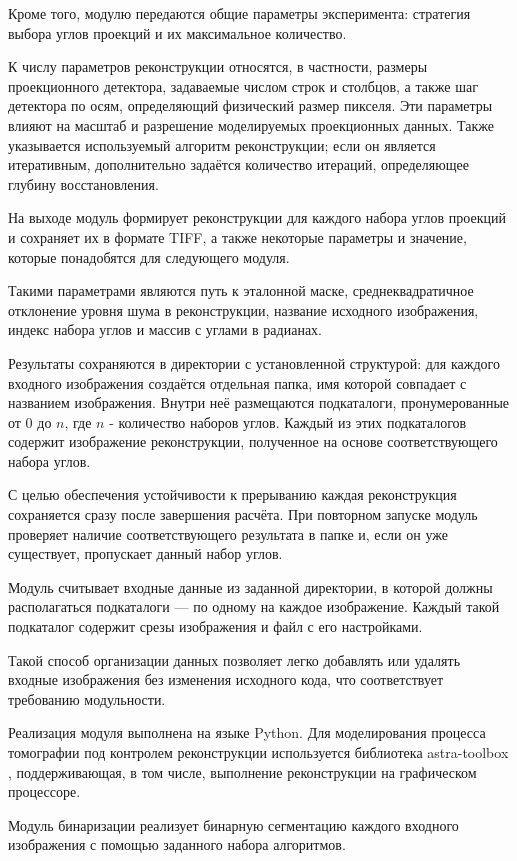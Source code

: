 Кроме того, модулю передаются общие параметры эксперимента: стратегия выбора углов проекций и их максимальное количество.

К числу параметров реконструкции относятся, в частности, размеры проекционного детектора, задаваемые числом строк и столбцов, а также шаг детектора по осям, определяющий физический размер пикселя. Эти параметры влияют на масштаб и разрешение моделируемых проекционных данных. Также указывается используемый алгоритм реконструкции; если он является итеративным, дополнительно задаётся количество итераций, определяющее глубину восстановления.

На выходе модуль формирует реконструкции для каждого набора углов проекций и сохраняет их в формате TIFF, а также некоторые параметры и значение, которые понадобятся для следующего модуля.

Такими параметрами являются путь к эталонной маске, среднеквадратичное отклонение уровня шума в реконструкции, название исходного изображения, индекс набора углов и массив с углами в радианах.

Результаты сохраняются в директории с установленной структурой: для каждого входного изображения создаётся отдельная папка, имя которой совпадает с названием изображения. Внутри неё размещаются подкаталоги, пронумерованные от  0 до \(n\), где \(n\) - количество наборов углов. Каждый из этих подкаталогов содержит изображение реконструкции, полученное на основе соответствующего набора углов.

С целью обеспечения устойчивости к прерыванию каждая реконструкция сохраняется сразу после завершения расчёта. При повторном запуске модуль проверяет наличие соответствующего результата в папке и, если он уже существует, пропускает данный набор углов.

Модуль считывает входные данные из заданной директории, в которой должны располагаться подкаталоги — по одному на каждое изображение. Каждый такой подкаталог содержит срезы изображения и файл с его настройками.

Такой способ организации данных позволяет легко добавлять или удалять входные изображения без изменения исходного кода, что соответствует требованию модульности.

Реализация модуля выполнена на языке Python. Для моделирования процесса томографии под контролем реконструкции используется библиотека astra-toolbox \cite{van2016fast}, поддерживающая, в том числе, выполнение реконструкции на графическом процессоре.

Модуль бинаризации реализует бинарную сегментацию каждого входного изображения с помощью заданного набора алгоритмов.

